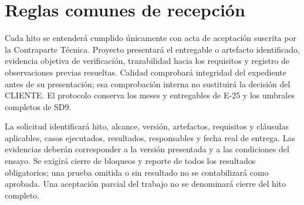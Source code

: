 \section{Reglas comunes de recepción}
Cada hito se entenderá cumplido únicamente con acta de aceptación suscrita por la Contraparte Técnica. Proyecto presentará el entregable o artefacto identificado, evidencia objetiva de verificación, trazabilidad hacia los requisitos y registro de observaciones previas resueltas. Calidad comprobará integridad del expediente antes de su presentación; esa comprobación interna no sustituirá la decisión del CLIENTE. El protocolo conserva los meses y entregables de E-25 y los umbrales completos de SD9. \parencite[art.~18.1--18.2, p.~13; Formulario E-25, p.~74]{sd9-ba}

La solicitud identificará hito, alcance, versión, artefactos, requisitos y cláusulas aplicables, casos ejecutados, resultados, responsables y fecha real de entrega. Las evidencias deberán corresponder a la versión presentada y a las condiciones del ensayo. Se exigirá cierre de bloqueos y reporte de todos los resultados obligatorios; una prueba omitida o sin resultado no se contabilizará como aprobada. Una aceptación parcial del trabajo no se denominará cierre del hito completo.

